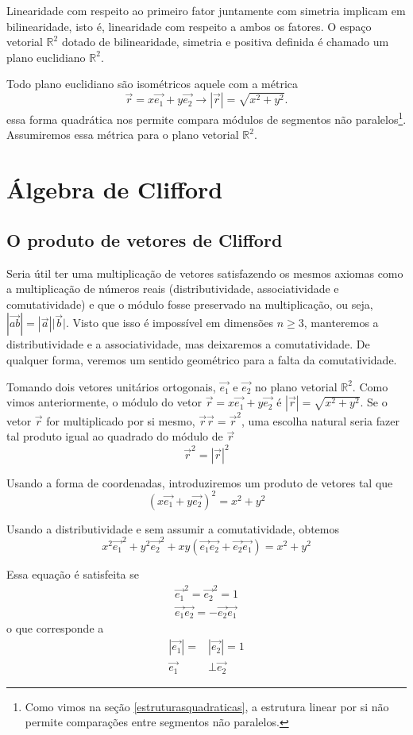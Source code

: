 \documentclass[12pt, oneside, a4paper, english, brazil]{abntex2}
\providecommand{\abs}[1]{\left\vert #1 \right\vert}
\providecommand{\p}[1]{\left( #1 \right)}
\providecommand{\Rdois}{\mathbb{R}^2}
\renewcommand{\vec}{\overrightarrow}
\theoremstyle{normal}
\theoremstyle{observacao}
\begin{document}
Linearidade com respeito ao primeiro fator juntamente com simetria implicam em bilinearidade, isto é, linearidade com respeito a ambos os fatores. O espaço vetorial $\Rdois$ dotado de bilinearidade, simetria e positiva definida é chamado um plano euclidiano $\Rdois$.

Todo plano euclidiano são isométricos aquele com a métrica
\[
\vec{r}=x\vec{e_1}+y\vec{e_2} \rightarrow \abs{\vec{r}}=\sqrt{x^2+y^2}.
\]
essa forma quadrática nos permite compara módulos de segmentos não paralelos\footnote{Como vimos na seção \ref{estruturasquadraticas}, a estrutura linear por si não permite comparações entre segmentos não paralelos.}. Assumiremos essa métrica para o plano vetorial $\Rdois$.

\chapter{Álgebra de Clifford}\label{clifford}
\section{O produto de vetores de Clifford}
Seria útil ter uma multiplicação de vetores satisfazendo os mesmos axiomas como a multiplicação de números reais (distributividade, associatividade e comutatividade) e que o módulo fosse preservado na multiplicação, ou seja, $\abs{\vec{ab}}=\abs{\vec{a}}\lvert\vec{b}\rvert$. Visto que isso é impossível em dimensões $n \geq 3$, manteremos a distributividade e a associatividade, mas deixaremos a comutatividade. De qualquer forma, veremos um sentido geométrico para a falta da comutatividade.

Tomando dois vetores unitários ortogonais, $\vec{e_1}$ e $\vec{e_2}$ no plano vetorial $\Rdois$. Como vimos anteriormente, o módulo do vetor $\vec{r}=x\vec{e_1}+y\vec{e_2}$ é $\abs{\vec{r}} = \sqrt{x^2+y^2}$. Se o vetor $\vec{r}$ for multiplicado por si mesmo, $\vec{r}\vec{r}=\vec{r}^2$, uma escolha natural seria fazer tal produto igual ao quadrado do módulo de $\vec{r}$
\[
\vec{r}^2 = \abs{\vec{r}}^2
\]

Usando a forma de coordenadas, introduziremos um produto de vetores tal que 
\[
\p{x\vec{e_1}+y\vec{e_2}}^2 = x^2 +y^2
\]

Usando a distributividade e sem assumir a comutatividade, obtemos
\[
x^2\vec{e_1}^2+y^2\vec{e_2}^2 +xy\p{\vec{e_1}\vec{e_2}+\vec{e_2}\vec{e_1}} = x^2+y^2
\]

Essa equação é satisfeita se
\begin{align*}
\vec{e_1}^2 = \vec{e_2}^2 = 1\\
\vec{e_1}\vec{e_2}=-\vec{e_2}\vec{e_1}
\end{align*}
o que corresponde a
\begin{align*}
\abs{\vec{e_1}} = &\abs{\vec{e_2}} = 1\\
\vec{e_1}&\bot\vec{e_2}
\end{align*}
\end{document}
